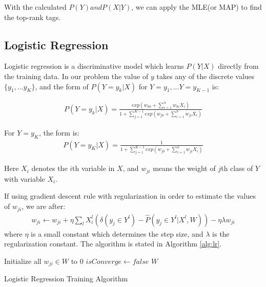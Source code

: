 With the calculated $P(Y) and P(X|Y)$, we can apply the MLE(or MAP) to find the top-rank tags.

\subsection{Logistic Regression}

Logistic regression is a discriminative model which learns $P(Y|X)$ directly from the training data. In our problem the value of $y$ takes any of the discrete values $\{y_1,...y_K\}$, and the form of $P(Y=y_k|X)$ for $Y=y_1,...Y=y_{K-1}$ is: 

\begin{gather}
	P(Y=y_k|X)=\frac{exp(w_{k0}+\sum_{i=1}^n{w_{ki}X_i})}{1+\sum_{j=1}^{K-1}exp(w_{j0}+\sum_{i=1}^n{w_{ji}X_i})}
\end{gather}

For $Y=y_K$, the form is:
\begin{gather}
	P(Y=y_K|X)=\frac{1}{1+\sum_{j=1}^{K-1}exp(w_{j0}+\sum_{i=1}^n{w_{ji}X_i})}
\end{gather}

Here $X_i$ denotes the $i$th variable in $X$, and $w_{ji}$ means the weight of $j$th class of $Y$ with variable $X_i$.

If using gradient descent rule with regularization in order to estimate the values of $w_{ji}$, we are after:
\begin{gather}
	w_{ji} \leftarrow w_{ji}+ \eta \sum_{l}X_{i}^{l}(\delta (y_{j} \in Y^{l})-\hat{P}(y_{j} \in Y^{l}|X^{l},W))- \eta \lambda w_{ji}
\end{gather}
where $\eta$ is a small constant which determines the step size, and $\lambda$ is the regularization constant. The algorithm is stated in Algorithm \ref{alg:lr}.

\IncMargin{1em}
\begin{algorithm}
\label{alg:lr}
\BlankLine
Initialize all $w_{ji} \in W$ to 0\;
$isConverge \leftarrow false$\;
\Return $W$\;
\caption{Logistic Regression Training Algorithm}\label{algo_disjdecomp}
\end{algorithm}
\DecMargin{1em}

